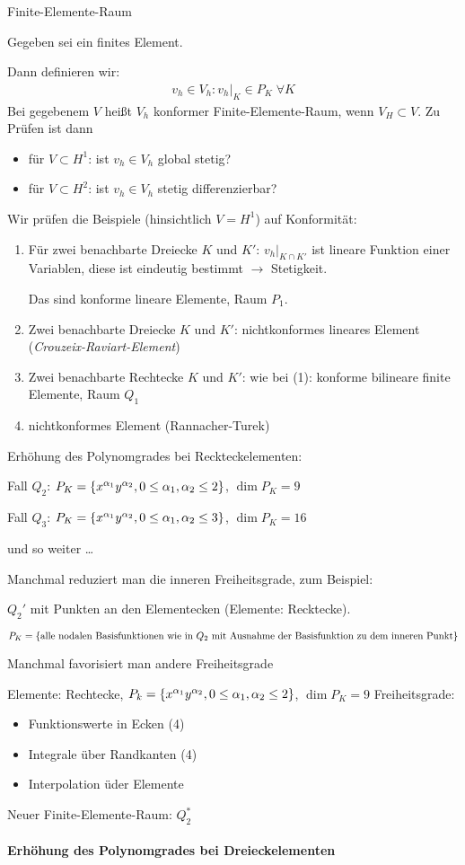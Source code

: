 \begin{definition} Finite-Elemente-Raum

Gegeben sei ein finites Element.

Dann definieren wir:
\begin{align*}
 v_h \in V_h: v_h|_K \in P_K \; \forall K
\end{align*}
Bei gegebenem $V$ heißt $V_h$ konformer Finite-Elemente-Raum, wenn $V_H \subset V$. Zu Prüfen ist dann
\begin{itemize}
\item für $V \subset H^1$: ist $v_h \in V_h$ global stetig?
\item für $V \subset H^2$: ist $v_h \in V_h$ stetig differenzierbar?
\end{itemize}
\end{definition}

Wir prüfen die Beispiele (hinsichtlich $V = H^1$) auf Konformität:
\begin{enumerate}
\item Für zwei benachbarte Dreiecke $K$ und $K'$: $v_h|_{K \cap K'}$ ist lineare Funktion einer Variablen, diese ist eindeutig bestimmt $\to$ Stetigkeit.

Das sind konforme lineare Elemente, Raum \emph{$P_1$}.
\item Zwei benachbarte Dreiecke $K$ und $K'$: nichtkonformes lineares Element (\emph{Crouzeix-Raviart-Element})
\item Zwei benachbarte Rechtecke $K$ und $K'$: wie bei (1): konforme bilineare finite Elemente, Raum \emph{$Q_1$}
\setcounter{enumi}{4}
\item nichtkonformes Element (Rannacher-Turek)
\end{enumerate}

Erhöhung des Polynomgrades bei Reckteckelementen:

Fall $Q_2$: $P_K = \left\{ x^{\alpha_1}y^{\alpha_2}, 0 \leq \alpha_1, \alpha_2 \leq 2 \right\}$, $\dim P_K = 9$

Fall $Q_3$: $P_K = \left\{ x^{\alpha_1}y^{\alpha_2}, 0 \leq \alpha_1, \alpha_2 \leq 3 \right\}$, $\dim P_K = 16$

und so weiter \dots

Manchmal reduziert man die inneren Freiheitsgrade, zum Beispiel:

\begin{beispiel}
  $Q_2'$ mit Punkten an den Elementecken (Elemente: Recktecke). 

$P_K = \left\{ \text{alle nodalen Basisfunktionen wie in }Q_2\text{ mit Ausnahme der Basisfunktion zu dem inneren Punkt} \right\}$
\end{beispiel}
Manchmal favorisiert man andere Freiheitsgrade
\begin{beispiel}
  Elemente: Rechtecke, $P_k = \left\{ x^{\alpha_1}y^{\alpha_2}, 0 \leq \alpha_1, \alpha_2 \leq 2 \right\}$, $\dim P_K = 9$
Freiheitsgrade:
\begin{itemize}
\item Funktionswerte in Ecken (4)
\item Integrale über Randkanten (4)
\item Interpolation üder Elemente
\end{itemize}
\end{beispiel}
Neuer Finite-Elemente-Raum: $Q_2^*$

\paragraph{Erhöhung des Polynomgrades bei Dreieckelementen}
